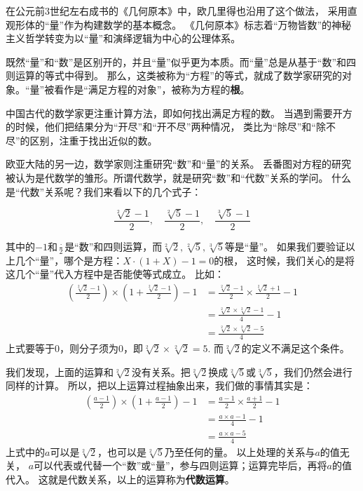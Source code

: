 \documentclass[12pt,UTF8]{ctexbook}
\begin{document}
\begin{appendix}
在公元前3世纪左右成书的《几何原本》中，欧几里得也沿用了这个做法，
采用直观形体的“量”作为构建数学的基本概念。
《几何原本》标志着“万物皆数”的神秘主义哲学转变为以“量”和演绎逻辑为中心的公理体系。

既然“量”和“数”是区别开的，并且“量”似乎更为本质。而“量”总是从基于“数”和四则运算的等式中得到。
那么，这类被称为“方程”的等式，就成了数学家研究的对象。“量”被看作是“满足方程的对象”，被称为方程的\textbf{根}。

中国古代的数学家更注重计算方法，即如何找出满足方程的数。
当遇到需要开方的时候，他们把结果分为“开尽”和“开不尽”两种情况，
类比为“除尽”和“除不尽”的区别，注重于找出近似的数。

欧亚大陆的另一边，数学家则注重研究“数”和“量”的关系。
丢番图对方程的研究被认为是代数学的雏形。所谓代数学，就是研究“数”和“代数”关系的学问。
什么是“代数”关系呢？我们来看以下的几个式子：

$$ \frac{\sqrt[2]{2} - 1}{2}, \quad \frac{\sqrt[2]{5} - 1}{2}, \quad \frac{\sqrt[3]{5} - 1}{2}$$

其中的$-1$和$\frac{\cdot}{2}$是“数”和四则运算，而$\sqrt[2]{2}, \sqrt[2]{5}, \sqrt[3]{5}$等是“量”。
如果我们要验证以上几个“量”，哪个是方程：$ X\cdot(1 + X) - 1 = 0 $的根，
这时候，我们关心的是将这几个“量”代入方程中是否能使等式成立。
比如：
\begin{align*}
    (\frac{\sqrt[2]{2} - 1}{2})\times(1 + \frac{\sqrt[2]{2} - 1}{2}) - 1 &= \frac{\sqrt[2]{2} - 1}{2} \times \frac{\sqrt[2]{2} + 1}{2} - 1  \\
    &= \frac{\sqrt[2]{2}\times \sqrt[2]{2} - 1}{4} - 1  \\
    &= \frac{\sqrt[2]{2}\times \sqrt[2]{2} - 5}{4}  
\end{align*}
上式要等于$0$，则分子须为$0$，即$\sqrt[2]{2}\times \sqrt[2]{2} = 5$. 而$\sqrt[2]{2}$的定义不满足这个条件。

我们发现，上面的运算和$\sqrt[2]{2}$没有关系。把$\sqrt[2]{2}$换成$\sqrt[2]{5}$或$\sqrt[3]{5}$，我们仍然会进行同样的计算。
所以，把以上运算过程抽象出来，我们做的事情其实是：
\begin{align*}
    (\frac{a - 1}{2})\times(1 + \frac{a - 1}{2}) - 1 &= \frac{a - 1}{2} \times \frac{a + 1}{2} - 1  \\
    &= \frac{a\times a - 1}{4} - 1  \\
    &= \frac{a\times a - 5}{4}  
\end{align*}
上式中的$a$可以是$\sqrt[2]{2}$，也可以是$\sqrt[2]{5}$乃至任何的量。
以上处理的关系与$a$的值无关，
$a$可以代表或代替一个“数”或“量”，参与四则运算；运算完毕后，再将$a$的值代入。
这就是代数关系，以上的运算称为\textbf{代数运算}。


\end{appendix}
\end{document}
